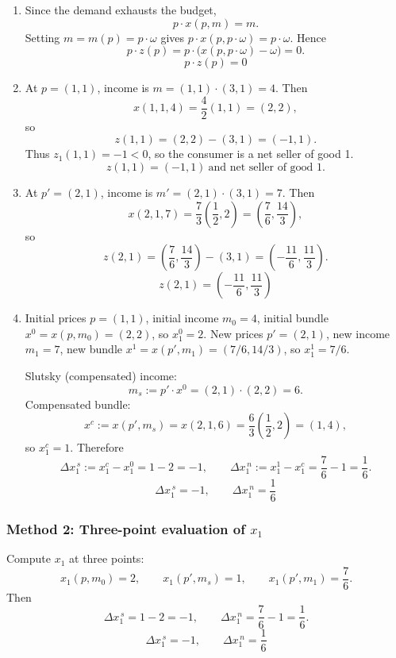 \documentclass[12pt]{article}
\newcommand{\dotp}{\cdot}
\begin{document}
\begin{enumerate}[label=\arabic*., leftmargin=*]
\item Since the demand exhausts the budget,
\[
p\dotp x(p,m)=m.
\]
Setting \(m=m(p)=p\dotp\omega\) gives \(p\dotp x(p,p\dotp\omega)=p\dotp\omega\). Hence
\[
p\dotp z(p)=p\dotp\bigl(x(p,p\dotp\omega)-\omega\bigr)=0.
\]
\[
\boxed{\,p\dotp z(p)=0\,}
\]

\item At \(p=(1,1)\), income is \(m=(1,1)\dotp(3,1)=4\). Then
\[
x(1,1,4)=\frac{4}{2}(1,1)=(2,2),
\]
so
\[
z(1,1)=(2,2)-(3,1)=(-1,1).
\]
Thus \(z_1(1,1)=-1<0\), so the consumer is a net seller of good 1.
\[
\boxed{\,z(1,1)=(-1,1)\ \text{and net seller of good 1.}\,}
\]

\item At \(p'=(2,1)\), income is \(m'=(2,1)\dotp(3,1)=7\). Then
\[
x(2,1,7)=\frac{7}{3}\left(\frac12,2\right)=\left(\frac{7}{6},\frac{14}{3}\right),
\]
so
\[
z(2,1)=\left(\frac{7}{6},\frac{14}{3}\right)-(3,1)=\left(-\frac{11}{6},\frac{11}{3}\right).
\]
\[
\boxed{\,z(2,1)=\left(-\dfrac{11}{6},\dfrac{11}{3}\right)\,}
\]

\item Initial prices \(p=(1,1)\), initial income \(m_0=4\), initial bundle \(x^0=x(p,m_0)=(2,2)\), so \(x_1^0=2\).
New prices \(p'=(2,1)\), new income \(m_1=7\), new bundle \(x^1=x(p',m_1)=(7/6,14/3)\), so \(x_1^1=7/6\).

Slutsky (compensated) income:
\[
m_s:=p'\dotp x^0=(2,1)\dotp(2,2)=6.
\]
Compensated bundle:
\[
x^c:=x(p',m_s)=x(2,1,6)=\frac{6}{3}\left(\frac12,2\right)=(1,4),
\]
so \(x_1^c=1\). Therefore
\[
\Delta x_1^{\,s}:=x_1^c-x_1^0=1-2=-1,
\qquad
\Delta x_1^{\,n}:=x_1^1-x_1^c=\frac{7}{6}-1=\frac{1}{6}.
\]
\[
\boxed{\,\Delta x_1^{\,s}=-1,\qquad \Delta x_1^{\,n}=\dfrac{1}{6}\,}
\]
\end{enumerate}

\subsubsection*{Method 2: Three-point evaluation of \(x_1\)}
Compute \(x_1\) at three points:
\[
x_1(p,m_0)=2,\qquad x_1(p',m_s)=1,\qquad x_1(p',m_1)=\frac{7}{6}.
\]
Then
\[
\Delta x_1^{\,s}=1-2=-1,\qquad
\Delta x_1^{\,n}=\frac{7}{6}-1=\frac{1}{6}.
\]
\[
\boxed{\,\Delta x_1^{\,s}=-1,\qquad \Delta x_1^{\,n}=\dfrac{1}{6}\,}
\]

\newpage
\end{document}
